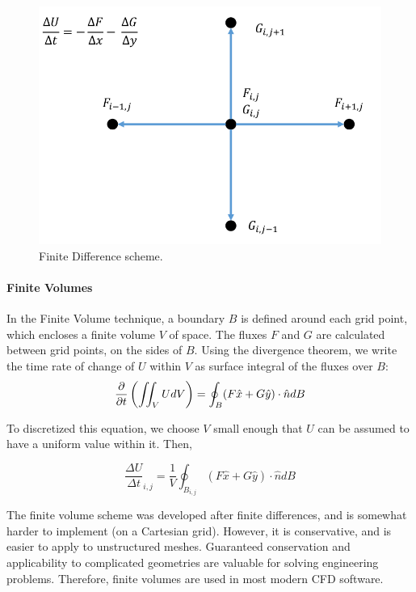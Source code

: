 \documentclass[paper=a4, fontsize=11pt]{scrartcl}
\numberwithin{equation}{section}        %
\numberwithin{figure}{section}          %
\numberwithin{table}{section}               %
\begin{document}
\begin{figure}[H]
    \centering
    \includegraphics[width = 0.8 \textwidth]{figures/finite_diff.png}
    \caption{Finite Difference scheme.}
    \label{fig:finite_diff}
\end{figure}

\paragraph{Finite Volumes}
In the Finite Volume technique, a boundary $B$ is defined around each grid point, which encloses a finite volume $V$ of space. The fluxes $F$ and $G$ are calculated between grid points, on the sides of $B$. Using the divergence theorem, we write the time rate of change of $U$ within $V$ as surface integral of the fluxes over $B$:
\begin{equation}
    \pdv{}{t} \left( \iint_V U dV \right) = \oint_B (F \hat{x} + G \hat{y}) \cdot \hat{n} dB
\end{equation}

To discretized this equation, we choose $V$ small enough that $U$ can be assumed to have a uniform value within it. Then,

\begin{equation}
    \frac{\Delta U}{\Delta t}_{i,j} = \frac{1}{V} \oint_{B_{i,j}} (F \hat{x} + G \hat{y}) \cdot \hat{n} dB
\end{equation}

The finite volume scheme was developed after finite differences, and is somewhat harder to implement (on a Cartesian grid). However, it is conservative, and is easier to apply to unstructured meshes. Guaranteed conservation and applicability to complicated geometries are valuable for solving engineering problems. Therefore, finite volumes are used in most modern CFD software.
\end{document}
